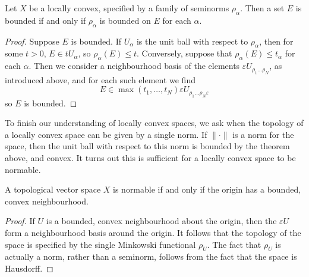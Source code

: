 \begin{theorem}
    Let $X$ be a locally convex, specified by a family of seminorms $\rho_\alpha$. Then a set $E$ is bounded if and only if $\rho_\alpha$ is bounded on $E$ for each $\alpha$.
\end{theorem}
\begin{proof}
    Suppose $E$ is bounded. If $U_\alpha$ is the unit ball with respect to $\rho_\alpha$, then for some $t > 0$, $E \in t U_\alpha$, so $\rho_\alpha(E) \leq t$. Conversely, suppose that $\rho_\alpha(E) \leq t_\alpha$ for each $\alpha$. Then we consider a neighbourhood basis of the elements $\varepsilon U_{\rho_1 \dots \rho_N}$, as introduced above, and for each such element we find
    \[ E \in \max(t_1, \dots, t_N) \varepsilon U_{\rho_1 \dots \rho_N \varepsilon} \]
    so $E$ is bounded.
\end{proof}

To finish our understanding of locally convex spaces, we ask when the topology of a locally convex space can be given by a single norm. If $\| \cdot \|$ is a norm for the space, then the unit ball with respect to this norm is bounded by the theorem above, and convex. It turns out this is sufficient for a locally convex space to be normable.

\begin{theorem}
    A topological vector space $X$ is normable if and only if the origin has a bounded, convex neighbourhood.
\end{theorem}
\begin{proof}
    If $U$ is a bounded, convex neighbourhood about the origin, then the $\varepsilon U$ form a neighbourhood basis around the origin. It follows that the topology of the space is specified by the single Minkowski functional $\rho_U$. The fact that $\rho_U$ is actually a norm, rather than a seminorm, follows from the fact that the space is Hausdorff.
\end{proof}

